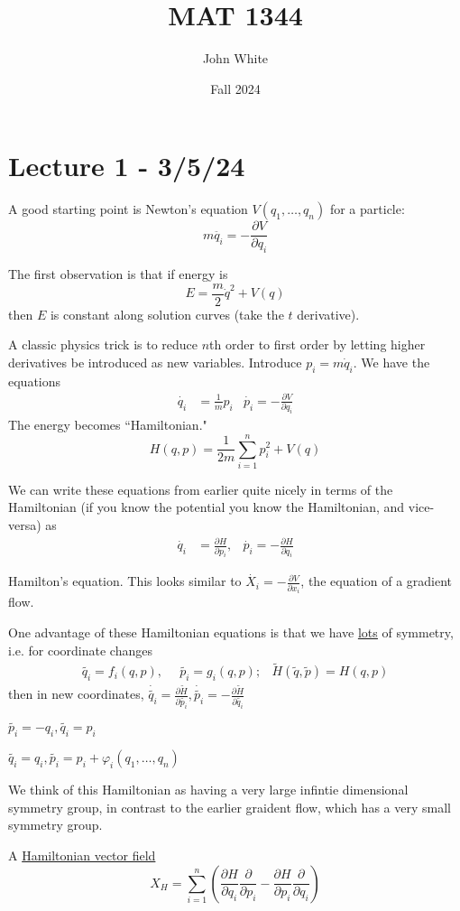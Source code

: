 \documentclass[x11names,reqno,14pt]{extarticle}
\title{MAT 1344}
\author{John White}
\date{Fall 2024}
\newcommand{\pp}[2]{\frac{\partial #1}{\partial #2}}
\begin{document}
\section*{Lecture 1 - 3/5/24}

A good starting point is Newton's equation $V(q_1, \dots, q_n)$ for a particle: 
\[
m\ddot{q_i} = -\pp{V}{q_i}
\]

The first observation is that if energy is 
\[
E = \frac{m}{2}\dot{q}^2 + V(q)
\]
then $E$ is constant along solution curves (take the $t$ derivative). 

A classic physics trick is to reduce $n$th order to first order by letting higher derivatives be introduced as new variables. Introduce $p_i = m\dot{q}_i$. We have the equations
\begin{align*}
\dot{q_i} & = \frac{1}{m}p_i  & \dot{p_i} = -\pp{V}{q_i}
\end{align*}
The energy becomes ``Hamiltonian." 
\[
H(q, p) = \frac{1}{2m}\sum_{i=1}^n p_i^2 + V(q)
\]

We can write these equations from earlier quite nicely in terms of the Hamiltonian (if you know the potential you know the Hamiltonian, and vice-versa) as 
\begin{align*}
\dot{q_i} & = \pp{H}{p_i},  & \dot{p_i} = -\pp{H}{q_i}
\end{align*}

Hamilton's equation. This looks similar to $\dot{X_i} = -\pp{V}{x_i}$, the equation of a gradient flow. 

One advantage of these Hamiltonian equations is that we have \underline{\underline{lots}} of symmetry, i.e. for coordinate changes 
\begin{align*}
\tilde{q_i} = f_i(q, p), \,\,\,& \tilde{p_i} = g_i(q, p); & \tilde{H}(\tilde{q},\tilde{p}) = H(q, p)
\end{align*}
then in new coordinates, $\dot{\tilde{q_i}} = \pp{\tilde{H}}{\tilde{p_i}}, \dot{\tilde{p_i}} = -\pp{\tilde{H}}{\tilde{q_i}}$

\exm

$\tilde{p_i} = -q_i, \tilde{q_i} = p_i$

\exm

$\tilde{q_i} = q_i, \tilde{p_i} = p_i + \varphi_i(q_1, \dots, q_n)$

We think of this Hamiltonian as having a very large infintie dimensional symmetry group, in contrast to the earlier graident flow, which has a very small symmetry group. 

A \underline{Hamiltonian vector field} 
\[
X_H = \sum_{i=1}^n \left(\pp{H}{q_i}\pp{}{p_i} - \pp{H}{p_i}\pp{}{q_i}\right)
\]
\end{document}
